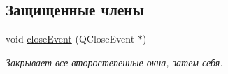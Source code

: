 \subsection*{Защищенные члены}
\begin{DoxyCompactItemize}
\item 
void \hyperlink{class_main_window_a38edb88d43e844aca9d2e762c8706565}{close\+Event} (Q\+Close\+Event $\ast$)\hypertarget{class_main_window_a38edb88d43e844aca9d2e762c8706565}{}\label{class_main_window_a38edb88d43e844aca9d2e762c8706565}

\begin{DoxyCompactList}\small\item\em Закрывает все второстепенные окна, затем себя. \end{DoxyCompactList}\end{DoxyCompactItemize}
